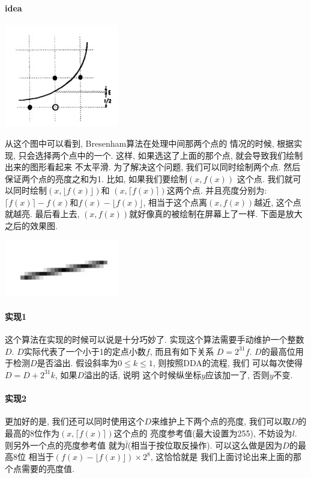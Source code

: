 \documentclass{article}
\begin{document}
			\paragraph{idea}
				\begin{center}
					\includegraphics[width = 5cm]{wu-idea.jpeg} \\
				\end{center}
				从这个图中可以看到, Bresenham算法在处理中间那两个点的
				情况的时候, 根据实现, 只会选择两个点中的一个. 这样,
				如果选这了上面的那个点, 就会导致我们绘制出来的图形看起来
				不太平滑. 为了解决这个问题, 我们可以同时绘制两个点. 
				然后保证两个点的亮度之和为1. 比如, 如果我们要绘制$(x, f(x))$
				这个点. 我们就可以同时绘制$(x, \lfloor f(x) \rfloor)$和
				$(x, \lceil f(x) \rceil)$这两个点. 并且亮度分别为:
				$\lceil f(x) \rceil - f(x)$和$f(x) - \lfloor f(x) \rfloor$, 
				相当于这个点离$(x, f(x))$越近, 这个点就越亮. 最后看上去, 
				$(x, f(x))$就好像真的被绘制在屏幕上了一样.
				下面是放大之后的效果图.
				\begin{center}
					\includegraphics[width = 5cm]{wu-draw.jpeg} \\
				\end{center}
			\paragraph{实现1}
				这个算法在实现的时候可以说是十分巧妙了.
				实现这个算法需要手动维护一个整数$D$. 
				$D$实际代表了一个小于1的定点小数$f$, 而且有如下关系
				$D = 2^{31}f$. $D$的最高位用于检测$D$是否溢出.
				假设斜率为$0 \leq k \leq 1$, 则按照DDA的流程, 我们
				可以每次使得$D = D + 2^{31}k$, 如果$D$溢出的话, 说明
				这个时候纵坐标$y$应该加一了, 否则$y$不变.
			\paragraph{实现2}
				更加好的是, 我们还可以同时使用这个$D$来维护上下两个点的亮度,
				我们可以取$D$的最高的8位作为$(x, \lceil f(x) \rceil)$这个点的
				亮度参考值(最大设置为255), 不妨设为$l$. 则另外一个点的亮度参考值
				就为$\bar{l}$(相当于按位取反操作). 可以这么做是因为$D$的最高8位
				相当于$(f(x) - \lfloor f(x) \rfloor) \times 2^8$, 这恰恰就是
				我们上面讨论出来上面的那个点需要的亮度值.
\end{document}
